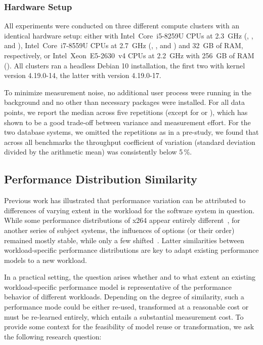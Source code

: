 {	\subsubsection{Hardware Setup}
	All experiments were conducted on three different compute clusters with an identical hardware setup: either with Intel~Core~i5-8259U CPUs at 2.3~GHz (\jumper, \kanzi, and \hsqldb),  Intel~Core~i7-8559U CPUs at 2.7~GHz (\dconvert, \batik, and \jadx) and 32~GB of RAM, respectively, or Intel~Xeon~E5-2630~v4 CPUs at 2.2~GHz with 256~GB of RAM (\htwo). All clusters ran a headless Debian 10 installation, the first two with kernel version \mbox{4.19.0-14}, the latter with version \mbox{4.19.0-17}. 
	
	To minimize measurement noise, no additional user process were running in the background and no other than necessary packages were installed.
	For all data points, we report the median across five repetitions (except for \hsqldb or \htwo), which has shown to be a good trade-off between variance and measurement effort. For the two database systems, we omitted the repetitions as in a pre-study, we found that across all benchmarks the throughput coefficient of variation (standard deviation divided by the arithmetic mean) was consistently below 5\,\%.
}

\subsection{Performance Distribution Similarity}
Previous work has illustrated that performance variation can be attributed to differences of varying extent in the workload for the software system in question. While some performance distributions of x264 appear entirely different~\cite{alves_sampling_2020}, for another series of subject systems, the influences of options (or their order) remained mostly stable, while only a few shifted~\cite{jamshidi_transfer_gp_2017,jamishidi_transfer_2017}. Latter similarities between workload-specific performance distributions are key to adapt existing performance models to a new workload. 

In a practical setting, the question arises whether and to what extent an existing workload-specific performance model is representative of the performance behavior of different workloads. Depending on the degree of similarity, such a performance mode could be either re-used, transformed at a reasonable cost or must be re-learned entirely, which entails a substantial measurement cost. To provide some context for the feasibility of model reuse or transformation, we ask the following research question: 

